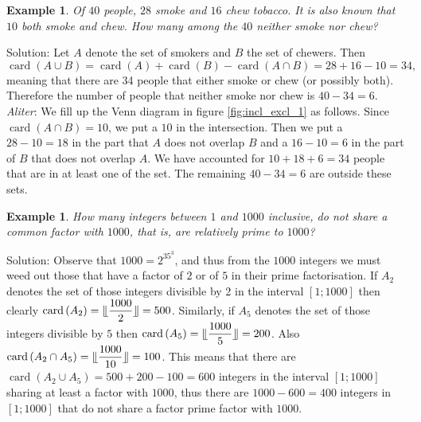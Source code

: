 \documentclass[11pt, openany]{book}
\theoremstyle{change} \theoremheaderfont{\blue\sffamily\bfseries}
\newtheorem{exa}[thm]{Example}
\theoremstyle{nonumberplain} \theoremheaderfont{\sffamily\bfseries}
\newcommand{\dis}{\displaystyle}
\newcommand{\í}{\'{\i}}
\def\card#1{\operatorname{card}\left(#1\right)}
\begin{document}
\begin{exa}
Of  $40$ people, $28$ smoke and  $16$ chew tobacco. It is also known
that  $10$ both smoke and chew. How many among the $40$ neither
smoke nor chew? \label{exa:incl_excl_1}\end{exa} Solution: Let $A$
denote the set of smokers and $B$ the set of chewers. Then
$$\card{A \cup B} = \card{A} + \card{B} - \card{A \cap B} = 28 + 16 - 10 = 34,$$
meaning that there are 34 people that either smoke or chew (or
possibly both). Therefore the number of people that neither smoke
nor chew is $40 - 34 = 6.$ \\
{\em Aliter}: We fill up the Venn diagram in figure
\ref{fig:incl_excl_1} as follows. Since $\card{A \cap B} = 10$, we
put a $10$ in the intersection. Then we put a $28 - 10 = 18$ in the
part that $A$ does not overlap $B$ and a $16 - 10 = 6$ in the part
of $B$ that does not overlap $A$. We have accounted for $10 + 18 + 6
= 34$ people that are in at least one of the set. The remaining $40
- 34 = 6$ are outside these sets.
\begin{exa}
How many integers between $1$ and $1000$ inclusive, do not share a
common factor with $1000$, that is, are relatively prime to $1000$?
\end{exa}
Solution:   Observe that $1000 = 2^35^3$, and thus from the $1000$
integers we must weed out those that have a factor of $2$ or of $5$
in their prime factorisation. If $A_2$ denotes the set of those
integers divisible by 2 in the interval $[1; 1000]$ then clearly
$\dis{ \card{A_2} = \llfloor \frac{1000}{2} \rrfloor} = 500$.
Similarly, if $A_5$ denotes the set of those integers divisible by
$5$ then $\dis{ \card{A_5} = \llfloor \frac{1000}{5} \rrfloor} =
200$. Also $\dis{ \card{A_2 \cap A_5} = \llfloor \frac{1000}{10}
\rrfloor} = 100$. This means that there are $\card{A_2 \cup A_5} =
500 + 200 - 100 = 600$ integers  in the interval $[1; 1000]$ sharing
at least a factor with $1000$, thus there are $1000 - 600 = 400$
integers in $[1; 1000]$ that do not share a factor prime factor with
$1000$.

\bigskip
\end{document}

